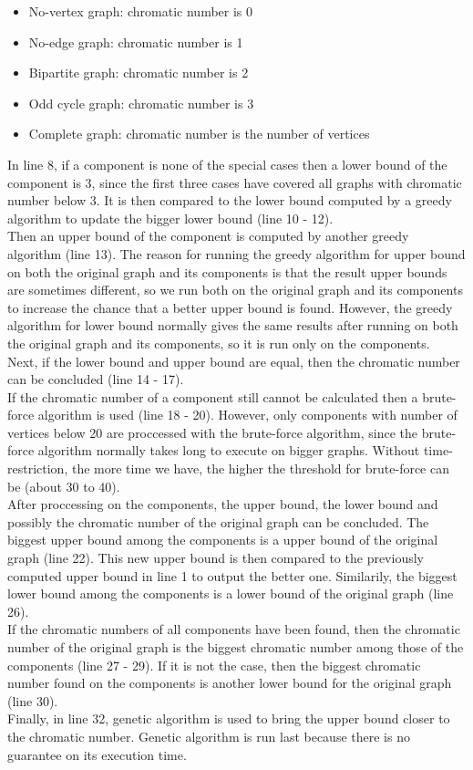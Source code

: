 \documentclass[a4paper]{report}
\begin{document}
	\begin{itemize}
		\item No-vertex graph: chromatic number is 0
		\item No-edge graph: chromatic number is 1
		\item Bipartite graph: chromatic number is 2
		\item Odd cycle graph: chromatic number is 3
		\item Complete graph: chromatic number is the number of vertices
	\end{itemize}
	In line 8, if a component is none of the special cases then a lower bound of the component is 3, since the first three cases have covered all graphs with chromatic number below 3. It is then compared to the lower bound computed by a greedy algorithm to update the bigger lower bound (line 10 - 12). \\
	Then an upper bound of the component is computed by another greedy algorithm (line 13). The reason for running the greedy algorithm for upper bound on both the original graph and its components is that the result upper bounds are sometimes different, so we run both on the original graph and its components to increase the chance that a better upper bound is found.  However, the greedy algorithm for lower bound normally gives the same results after running on both the original graph and its components, so it is run only on the components. \\
	Next, if the lower bound and upper bound are equal, then the chromatic number can be concluded (line 14 - 17). \\
	If the chromatic number of a component still cannot be calculated then a brute-force algorithm is used (line 18 - 20). However, only components with number of vertices below 20 are proccessed with the brute-force algorithm, since the brute-force algorithm normally takes long to execute on bigger graphs. Without time-restriction, the more time we have, the higher the threshold for brute-force can be (about 30 to 40).\\
	
	After proccessing on the components, the upper bound, the lower bound and possibly the chromatic number of the original graph can be concluded. The biggest upper bound among the components is a upper bound of the original graph (line 22). This new upper bound is then compared to the previously computed upper bound in line 1 to output the better one. Similarily, the biggest lower bound among the components is a lower bound of the original graph (line 26). \\
	If the chromatic numbers of all components have been found, then the chromatic number of the original graph is the biggest chromatic number among those of the components (line 27 - 29). If it is not the case, then the biggest chromatic number found on the components is another lower bound for the original graph (line 30).\\
	Finally, in line 32, genetic algorithm is used to bring the upper bound closer to the chromatic number. Genetic algorithm is run last because there is no guarantee on its execution time.\\
	
\end{document}
